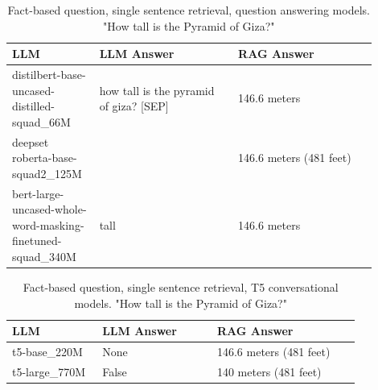 \documentclass{wseas}
\begin{document}
\begin{table}[htbp]
  \centering
  \caption{Fact-based question, single sentence retrieval, question answering models. "How tall is the Pyramid of Giza?"} %
  \label{tab:experiment_R_1_sentence_Q_fact_M_question_answering_table}  %
    \begin{tabular}{|p{0.2\linewidth}|p{0.35\linewidth}|p{0.35\linewidth}|}
      \hline
      \textbf{LLM} & \textbf{LLM Answer} & \textbf{RAG Answer} \\ \hline
      distilbert-base-uncased-distilled-squad\_66M & how tall is the pyramid of giza? {[}SEP{]} & 146.6 meters \\ \hline
      deepset roberta-base-squad2\_125M &  & 146.6 meters (481 feet) \\ \hline
      bert-large-uncased-whole-word-masking-finetuned-squad\_340M & tall & 146.6 meters \\ \hline
    \end{tabular}
\end{table}
\begin{table}[htbp]
  \centering
  \caption{Fact-based question, single sentence retrieval, T5 conversational models. "How tall is the Pyramid of Giza?"} %
  \label{tab:experiment_R_1_sentence_Q_fact_M_T5_table}  %
  \begin{tabular}{|p{0.22\linewidth}|p{0.29\linewidth}|p{0.35\linewidth}|}
    \hline
    \textbf{LLM} & \textbf{LLM Answer} & \textbf{RAG Answer} \\ \hline
    t5-base\_220M & None & 146.6 meters (481 feet) \\ \hline
    t5-large\_770M & False & 140 meters (481 feet) \\ \hline
  \end{tabular}
\end{table}
\end{document}
